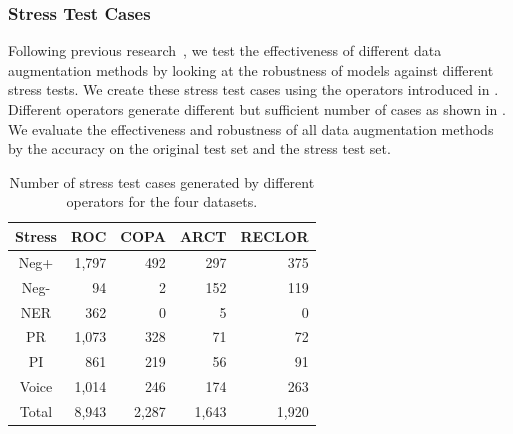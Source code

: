 \subsubsection{Stress Test Cases}
Following previous research~\cite{checklist2020acl}, 
we test the effectiveness of different data augmentation
methods by looking at the robustness of models against
different stress tests.
We create these stress test cases using the operators
introduced in .
Different operators generate different but sufficient number of cases 
as shown in . 
We evaluate the effectiveness and robustness of all data augmentation methods 
by the accuracy on the original test set and the stress test set.



\begin{table}[th]
\centering
\scriptsize
\begin{tabular}{c|rrrr}
\toprule
\textbf{Stress} & \textbf{ROC} & \textbf{COPA} & \textbf{ARCT} & \textbf{RECLOR} \\ \midrule
Neg+  & 1,797&492&  297&375 \\ \hline
Neg-  & 94& 2&  152&    119\\ \hline
NER  &  362&    0&  5&0 \\ \hline
PR  &   1,073&  328&71&72   \\ \hline
PI  &        861&   219&    56& 91\\  \hline
Voice  &    1,014&246   &174    &263    \\  \midrule
Total &8,943    &2,287  &1,643  &1,920 \\ \bottomrule
\end{tabular}
\caption{Number of stress test cases generated
by different operators for the four datasets.}
\label{tab:cases}
\end{table}

